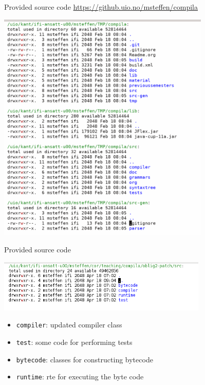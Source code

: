 \documentclass{beamer}
\begin{document}
\begin{frame}[label={sec:orgface421}]{Provided source code}
\url{https://github.uio.no/msteffen/compila}

\includegraphics[width=0.76\textwidth]{figures/snaps/directorystruct}
\end{frame}



\begin{frame}[label={sec:orgfb2ccad},fragile]{Provided source code}

 \begin{center}
 \includegraphics[width=0.75\textwidth]{figures/snaps/directory-src}
\end{center}



\begin{itemize}
\item \texttt{compiler}: updated compiler class
\item \texttt{test}:   some code for performing tests
\item \texttt{bytecode}: classes for constructing bytecode
\item \texttt{runtime}: rte for executing the byte code
\end{itemize}
\end{frame}
\end{document}

